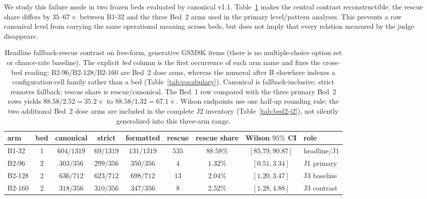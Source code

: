\documentclass{article}
\begin{document}
We study this failure mode in two frozen beds evaluated by canonical v1.1.
Table~\ref{tab:rescue} makes the central contrast reconstructible: the rescue
share differs by $35$--$67\times$ between \textsc{B1-32} and the three Bed~2
arms used in the primary level/pattern analyses.  This prevents a raw
canonical level from carrying the same operational meaning across beds, but
does not imply that every relation measured by the judge disappears.
\begin{table}[!h]
\centering\footnotesize
\setlength{\tabcolsep}{3pt}
\begin{tabular}{@{}lcccccccl@{}}
\toprule
arm & bed & canonical & strict & formatted & rescue & rescue share & Wilson $95\%$ CI & role \\
\midrule
\textsc{B1-32}  & 1 & $604/1319$ & $69/1319$  & $131/1319$ & $535$ & $88.58\%$ & $[85.79,90.87]$ & headline/J1 \\
\textsc{B2-96}  & 2 & $303/356$  & $299/356$ & $350/356$  & $4$   & $1.32\%$  & $[0.51,3.34]$   & J1 primary \\
\textsc{B2-128} & 2 & $636/712$  & $623/712$ & $698/712$  & $13$  & $2.04\%$  & $[1.20,3.47]$   & J3 baseline \\
\textsc{B2-160} & 2 & $318/356$  & $310/356$ & $347/356$  & $8$   & $2.52\%$  & $[1.28,4.88]$   & J3 contrast \\
\bottomrule
\end{tabular}
\caption{Headline fallback-rescue contrast on free-form, generative GSM8K
items (there is no multiple-choice option set or chance-rate baseline).  The
explicit \emph{bed} column is the first occurrence of each arm name and fixes
the cross-bed reading: \textsc{B2-96}/\textsc{B2-128}/\textsc{B2-160} are Bed~2
dose arms, whereas the numeral after B elsewhere indexes a configuration-cell
family rather than a bed (Table~\ref{tab:vocabulary}).
Canonical is fallback-inclusive;
strict removes fallback; rescue share is $\mathrm{rescue}/\mathrm{canonical}$.
The Bed~1 row compared with the three primary Bed~2 rows yields
$88.58/2.52=35.2\times$ to $88.58/1.32=67.1\times$.  Wilson endpoints use
one half-up rounding rule; the two additional
Bed~2 dose arms are included in the complete J2 inventory
(Table~\ref{tab:bed2-j2}), not silently generalized into this three-arm range.}
\label{tab:rescue}
\end{table}
\end{document}
